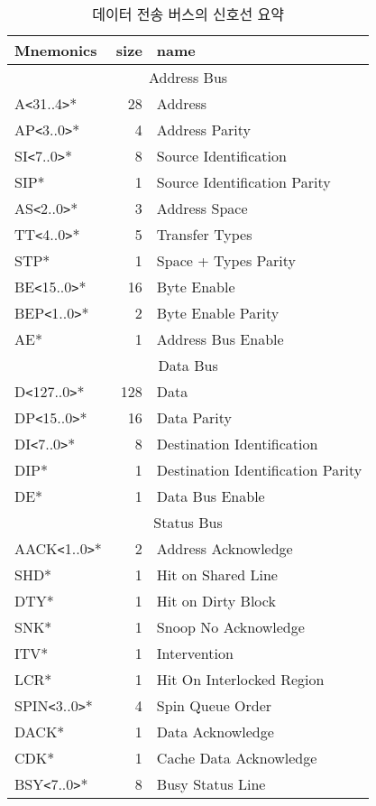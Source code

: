 %
%
\begin{table}[htbp]
\caption{데이터 전송 버스의 신호선 요약}
   \begin{center}
   \begin{tabular}{|l|r|l|} \hline
      Mnemonics & size & name \\ \hline \hline
      \multicolumn{3}{|c|}{Address Bus} \\ \hline
      A{\tt <}31..4{\tt >}*  & 28 & Address \\
      AP{\tt <}3..0{\tt >}*  & 4 & Address Parity \\
      SI{\tt <}7..0{\tt >}*  & 8 & Source Identification \\
      SIP*                   & 1 & Source Identification Parity \\
      AS{\tt <}2..0{\tt >}*  & 3 & Address Space \\
      TT{\tt <}4..0{\tt >}*  & 5 & Transfer Types \\
      STP*                   & 1 & Space + Types Parity \\
      BE{\tt <}15..0{\tt >}* & 16 & Byte Enable \\
      BEP{\tt <}1..0{\tt >}* & 2 & Byte Enable Parity \\
      AE*                    & 1 & Address Bus Enable \\ \hline
      \multicolumn{3}{|c|}{Data Bus} \\ \hline
      D{\tt <}127..0{\tt >}* & 128 & Data \\
      DP{\tt <}15..0{\tt >}* & 16 & Data Parity \\
      DI{\tt <}7..0{\tt >}*  & 8 & Destination Identification \\
      DIP*                   & 1 & Destination Identification Parity \\
      DE*                    & 1 & Data Bus Enable \\ \hline
      \multicolumn{3}{|c|}{Status Bus} \\ \hline
      AACK{\tt <}1..0{\tt >}* & 2 & Address Acknowledge \\
      SHD*                    & 1 & Hit on Shared Line \\
      DTY*                    & 1 & Hit on Dirty Block \\
      SNK*                    & 1 & Snoop No Acknowledge \\
      ITV*                    & 1 & Intervention \\
      LCR*                    & 1 & Hit On Interlocked Region \\
      SPIN{\tt <}3..0{\tt >}* & 4 & Spin Queue Order \\
      DACK*                   & 1 & Data Acknowledge \\
      CDK*                    & 1 & Cache Data Acknowledge \\
      BSY{\tt <}7..0{\tt >}* & 8 & Busy Status Line \\ \hline
   \end{tabular}
   \end{center}
\end{table}
%
%
